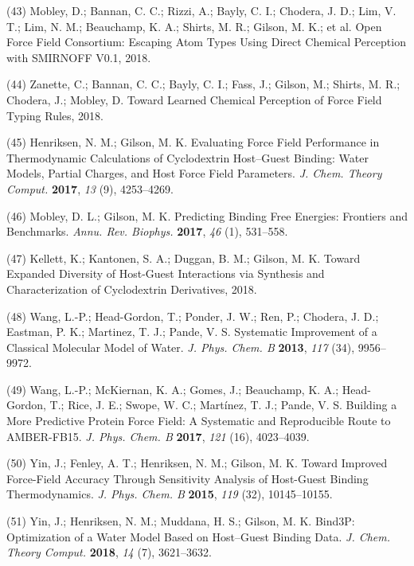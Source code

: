 \documentclass[11pt,notitlepage]{article}
\begin{document}
\leavevmode\hypertarget{ref-HlBr7NrU}{}%
(43) Mobley, D.; Bannan, C. C.; Rizzi, A.; Bayly, C. I.; Chodera, J. D.;
Lim, V. T.; Lim, N. M.; Beauchamp, K. A.; Shirts, M. R.; Gilson, M. K.;
et al. Open Force Field Consortium: Escaping Atom Types Using Direct
Chemical Perception with SMIRNOFF V0.1, 2018.

\leavevmode\hypertarget{ref-13lTSBgHy}{}%
(44) Zanette, C.; Bannan, C. C.; Bayly, C. I.; Fass, J.; Gilson, M.;
Shirts, M. R.; Chodera, J.; Mobley, D. Toward Learned Chemical
Perception of Force Field Typing Rules, 2018.

\leavevmode\hypertarget{ref-HVgz5rZq}{}%
(45) Henriksen, N. M.; Gilson, M. K. Evaluating Force Field Performance
in Thermodynamic Calculations of Cyclodextrin Host--Guest Binding: Water
Models, Partial Charges, and Host Force Field Parameters. \emph{J. Chem.
Theory Comput.} \textbf{2017}, \emph{13} (9), 4253--4269.

\leavevmode\hypertarget{ref-12BD3oHp4}{}%
(46) Mobley, D. L.; Gilson, M. K. Predicting Binding Free Energies:
Frontiers and Benchmarks. \emph{Annu. Rev. Biophys.} \textbf{2017},
\emph{46} (1), 531--558.

\leavevmode\hypertarget{ref-13gqBX78S}{}%
(47) Kellett, K.; Kantonen, S. A.; Duggan, B. M.; Gilson, M. K. Toward
Expanded Diversity of Host-Guest Interactions via Synthesis and
Characterization of Cyclodextrin Derivatives, 2018.

\leavevmode\hypertarget{ref-50lAQZra}{}%
(48) Wang, L.-P.; Head-Gordon, T.; Ponder, J. W.; Ren, P.; Chodera, J.
D.; Eastman, P. K.; Martinez, T. J.; Pande, V. S. Systematic Improvement
of a Classical Molecular Model of Water. \emph{J. Phys. Chem. B}
\textbf{2013}, \emph{117} (34), 9956--9972.

\leavevmode\hypertarget{ref-1E3wArY0j}{}%
(49) Wang, L.-P.; McKiernan, K. A.; Gomes, J.; Beauchamp, K. A.;
Head-Gordon, T.; Rice, J. E.; Swope, W. C.; Martínez, T. J.; Pande, V.
S. Building a More Predictive Protein Force Field: A Systematic and
Reproducible Route to AMBER-FB15. \emph{J. Phys. Chem. B} \textbf{2017},
\emph{121} (16), 4023--4039.

\leavevmode\hypertarget{ref-xRauI5mb}{}%
(50) Yin, J.; Fenley, A. T.; Henriksen, N. M.; Gilson, M. K. Toward
Improved Force-Field Accuracy Through Sensitivity Analysis of Host-Guest
Binding Thermodynamics. \emph{J. Phys. Chem. B} \textbf{2015},
\emph{119} (32), 10145--10155.

\leavevmode\hypertarget{ref-NeqIQDLp}{}%
(51) Yin, J.; Henriksen, N. M.; Muddana, H. S.; Gilson, M. K. Bind3P:
Optimization of a Water Model Based on Host--Guest Binding Data.
\emph{J. Chem. Theory Comput.} \textbf{2018}, \emph{14} (7), 3621--3632.
\end{document}
